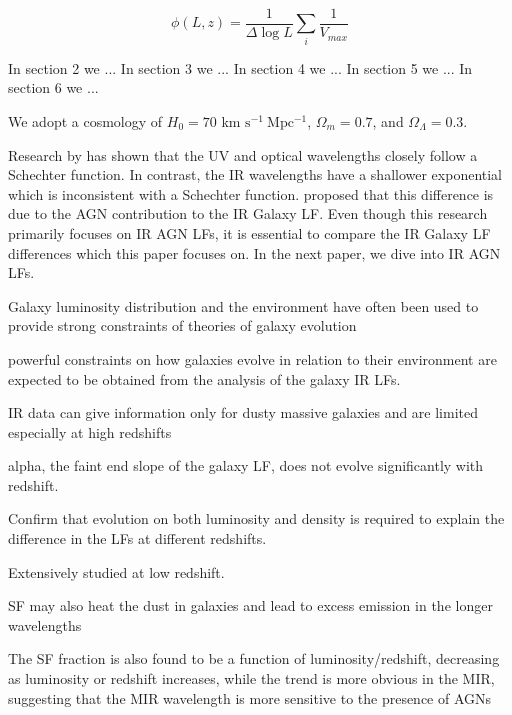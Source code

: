 \begin{equation} \label{EQ: Vmax}
    \phi(L,z) = \frac{1}{\Delta \log L}\sum_i \frac{1}{V_{max}}
\end{equation}

In section 2 we ... In section 3 we ... In section 4 we ... In section 5 we ... In section 6 we ...

We adopt a cosmology of $H_0 = 70$ km $\mathrm{s^{-1}\ Mpc^{-1}}$, $\Omega_m=0.7$, and $\Omega_\Lambda=0.3$.

\color{red}
Research by \cite{wu_mid-infrared_2011} has shown that the UV and optical wavelengths closely follow a Schechter function. In contrast, the IR wavelengths have a shallower exponential which is inconsistent with a Schechter function. \cite{fu_decomposing_2010} proposed that this difference is due to the AGN contribution to the IR Galaxy LF. Even though this research primarily focuses on IR AGN LFs, it is essential to compare the IR Galaxy LF differences which this paper focuses on. In the next paper, we dive into IR AGN LFs.

\color{LimeGreen}
Galaxy luminosity distribution and the environment have often been used to provide strong constraints of theories of galaxy evolution \cite{biviano_spitzer_2011}

powerful constraints on how galaxies evolve in relation to their environment are expected to be obtained from the analysis of the galaxy IR LFs. \cite{biviano_spitzer_2011}

IR data can give information only for dusty massive galaxies and are limited especially at high redshifts \cite{katsianis_evolution_2017}

alpha, the faint end slope of the galaxy LF, does not evolve significantly with redshift. \cite{wylezalek_galaxy_2014}

Confirm that evolution on both luminosity and density is required to explain the difference in the LFs at different redshifts. \cite{wu_mid-infrared_2011}

Extensively studied at low redshift. \cite{wu_mid-infrared_2011}

SF may also heat the dust in galaxies and lead to excess emission in the longer wavelengths \cite{oconnor_luminosity_2016}

The SF fraction is also found to be a function of luminosity/redshift, decreasing as luminosity or redshift increases, while the trend is more obvious in the MIR, suggesting that the MIR wavelength is more sensitive to the presence of AGNs \cite{wu_mid-infrared_2011}

